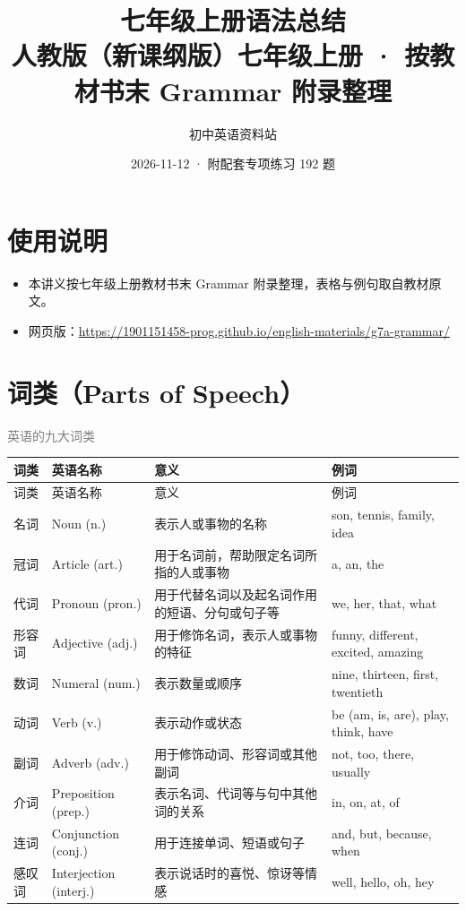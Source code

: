\documentclass[11pt,a4paper]{ctexart}
\title{\textbf{七年级上册语法总结}\\[4pt]
\large 人教版（新课纲版）七年级上册 · 按教材书末 Grammar 附录整理}
\author{初中英语资料站}
\date{2026-11-12 · 附配套专项练习 192 题}
\begin{document}
\maketitle
\section*{使用说明}
\begin{itemize}[leftmargin=1.4em]
\item 本讲义按七年级上册教材书末 Grammar 附录整理，表格与例句取自教材原文。
\item 网页版：\url{https://1901151458-prog.github.io/english-materials/g7a-grammar/}
\end{itemize}

\section{词类（Parts of Speech）}
\noindent\textcolor{gray}{英语的九大词类}\par\smallskip
{\footnotesize
\begin{longtable}{p{3.35cm}p{3.35cm}p{3.35cm}p{3.35cm}}
\hline
词类 & 英语名称 & 意义 & 例词 \\
\hline
\endfirsthead
\hline
词类 & 英语名称 & 意义 & 例词 \\
\hline
\endhead
\hline
\endfoot
名词 & Noun (n.) & 表示人或事物的名称 & son, tennis, family, idea \\
冠词 & Article (art.) & 用于名词前，帮助限定名词所指的人或事物 & a, an, the \\
代词 & Pronoun (pron.) & 用于代替名词以及起名词作用的短语、分句或句子等 & we, her, that, what \\
形容词 & Adjective (adj.) & 用于修饰名词，表示人或事物的特征 & funny, different, excited, amazing \\
数词 & Numeral (num.) & 表示数量或顺序 & nine, thirteen, first, twentieth \\
动词 & Verb (v.) & 表示动作或状态 & be (am, is, are), play, think, have \\
副词 & Adverb (adv.) & 用于修饰动词、形容词或其他副词 & not, too, there, usually \\
介词 & Preposition (prep.) & 表示名词、代词等与句中其他词的关系 & in, on, at, of \\
连词 & Conjunction (conj.) & 用于连接单词、短语或句子 & and, but, because, when \\
感叹词 & Interjection (interj.) & 表示说话时的喜悦、惊讶等情感 & well, hello, oh, hey \\
\end{longtable}
}
\end{document}
